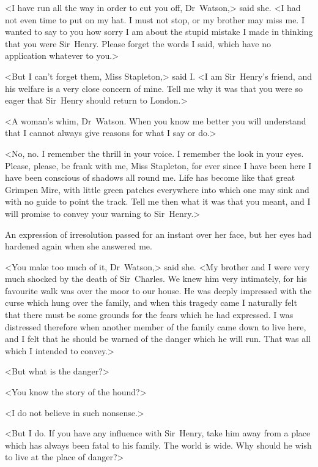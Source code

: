<I have run all the way in order to cut you off, Dr~Watson,> said she. <I had not even time to put on my hat. I must not stop, or my brother may miss me. I wanted to say to you how sorry I am about the stupid mistake I made in thinking that you were Sir~Henry. Please forget the words I said, which have no application whatever to you.>

<But I can't forget them, Miss Stapleton,> said I\@. <I am Sir~Hen\-ry's friend, and his welfare is a very close concern of mine. Tell me why it was that you were so eager that Sir~Henry should return to London.>

<A woman's whim, Dr~Watson. When you know me better you will understand that I cannot always give reasons for what I say or do.>

<No, no. I remember the thrill in your voice. I remember the look in your eyes. Please, please, be frank with me, Miss Stapleton, for ever since I have been here I have been conscious of shadows all round me. Life has become like that great Grimpen Mire, with little green patches everywhere into which one may sink and with no guide to point the track. Tell me then what it was that you meant, and I will promise to convey your warning to Sir~Henry.>

An expression of irresolution passed for an instant over her face, but her eyes had hardened again when she answered me.

<You make too much of it, Dr~Watson,> said she. <My brother and I were very much shocked by the death of Sir~Charles. We knew him very intimately, for his favourite walk was over the moor to our house. He was deeply impressed with the curse which hung over the family, and when this tragedy came I naturally felt that there must be some grounds for the fears which he had expressed. I was distressed therefore when another member of the family came down to live here, and I felt that he should be warned of the danger which he will run. That was all which I intended to convey.>

<But what is the danger?>

<You know the story of the hound?>





<I do not believe in such nonsense.>

<But I do. If you have any influence with Sir~Henry, take him away from a place which has always been fatal to his family. The world is wide. Why should he wish to live at the place of danger?>

